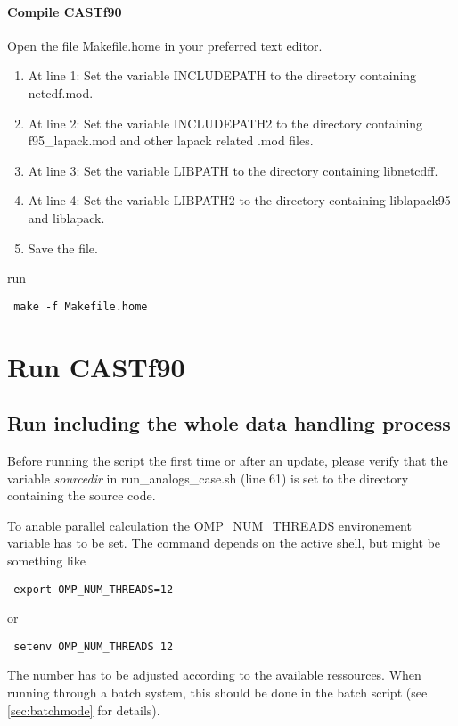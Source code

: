 \documentclass[11p,a4paper]{article}
\begin{document}
\paragraph{Compile CASTf90}
Open the file Makefile.home in your preferred text editor.
\begin{enumerate}
\item At line 1: Set the variable INCLUDEPATH to the directory containing netcdf.mod.
\item At line 2: Set the variable INCLUDEPATH2 to the directory containing f95\_lapack.mod and other lapack related .mod files.
\item At line 3: Set the variable LIBPATH to the directory containing libnetcdff.
\item At line 4: Set the variable LIBPATH2 to the directory containing liblapack95 and liblapack.
\item Save the file.
\end{enumerate}
run
\begin{verbatim}
 make -f Makefile.home
\end{verbatim}

\section{Run CASTf90}
\subsection{Run including the whole data handling process}
Before running the script the first time or after an update, please verify that the variable \textit{sourcedir} in run\_analogs\_case.sh (line 61) is set to the directory containing the source code.

To anable parallel calculation the OMP\_NUM\_THREADS environement variable has to be set. The command depends on the active shell, but might be something like 
\begin{verbatim}
 export OMP_NUM_THREADS=12
\end{verbatim}
or 
\begin{verbatim}
 setenv OMP_NUM_THREADS 12
\end{verbatim}
The number has to be adjusted according to the available ressources.
When running through a batch system, this should be done in the batch script (see  \autoref{sec:batchmode} for details).
\end{document}
